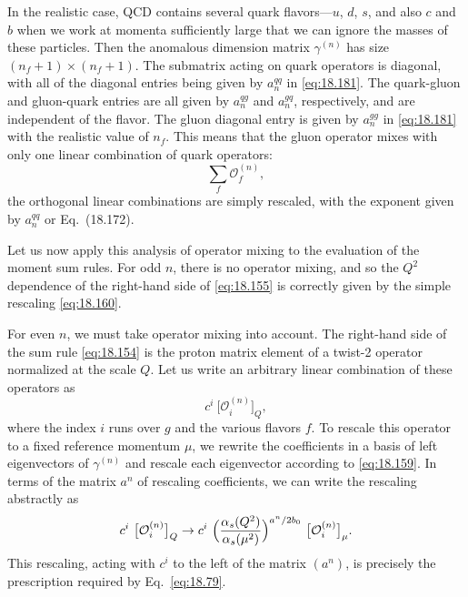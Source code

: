 In the realistic case, QCD contains several quark flavors---$u$, $d$, $s$,
and also $c$ and $b$ when we work at momenta sufficiently large that we can
ignore the masses of these particles.  Then the anomalous dimension matrix
$\gamma^{(n)}$ has size $(n_f+1)\times(n_f+1)$.  The submatrix acting on
quark operators is diagonal, with all of the diagonal entries being given by
$a_n^{qq}$ in \eqref{eq:18.181}.  The quark-gluon and gluon-quark entries are
all given by $a_n^{qg}$ and $a_n^{gq}$, respectively, and are independent of
the flavor.  The gluon diagonal entry is given by $a_n^{gg}$ in
\eqref{eq:18.181} with the realistic value of $n_f$.  This means that the
gluon operator mixes with only one linear combination of quark operators:
\begin{equation}
  \sum_f \mathcal{O}^{(n)}_f ,
  \label{eq:18.182}
\end{equation}
the orthogonal linear combinations are simply rescaled, with the exponent
given by $a_n^{qq}$ or Eq.~(18.172).

Let us now apply this analysis of operator mixing to the evaluation of the
moment sum rules.  For odd $n$, there is no operator mixing, and so the $Q^2$
dependence of the right-hand side of \eqref{eq:18.155} is correctly given by
the simple rescaling \eqref{eq:18.160}.

For even $n$, we must take operator mixing into account.  The right-hand
side of the sum rule \eqref{eq:18.154} is the proton matrix element of a
twist-2 operator normalized at the scale $Q$.  Let us write an arbitrary
linear combination of these operators as
\begin{equation}
  c^i\ \bigl[ \mathcal{O}^{(n)}_i \bigr]_Q ,
  \label{eq:18.183}
\end{equation}
where the index $i$ runs over $g$ and the various flavors $f$.  To rescale
this operator to a fixed reference momentum $\mu$, we rewrite the
coefficients in a basis of left eigenvectors of $\gamma^{(n)}$ and rescale
each eigenvector according to \eqref{eq:18.159}.  In terms of the matrix
$a^n$ of rescaling coefficients, we can write the rescaling abstractly as
\begin{equation}
  c^i\ \bigl[ \mathcal{O}^{(n)}_i \bigr]_Q \to c^i\ \Bigl( \frac{\alpha_s(Q^2)}
    {\alpha_s(\mu^2)} \Bigr)^{a^n/2b_0}\ \bigl[ \mathcal{O}^{(n)}_i
      \bigr]_\mu .
  \label{eq:18.184}
\end{equation}
This rescaling, acting with $c^i$ to the left of the matrix $(a^n)$, is
precisely the prescription required by Eq.~\eqref{eq:18.79}.

